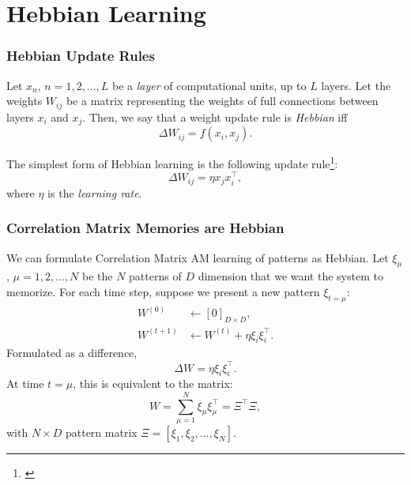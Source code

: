 \documentclass{beamer}
\begin{document}
\section{Hebbian Learning}
\begin{frame}
\frametitle{Hebbian Update Rules}
\begin{definition}
    Let $x_n$, $n = 1, 2, \dots, L$ be a \textit{layer} of computational
    units, up to $L$ layers. Let the weights $W_{ij}$ be a matrix 
    representing the weights of full connections between layers $x_i$ and
    $x_j$. Then, we say that a weight update rule is \textit{Hebbian} iff
    $$
    \Delta W_{ij} = f(x_i, x_j).
    $$
\end{definition}

\begin{example}
    The simplest form of Hebbian learning is the following update rule\footnote{\parencite{haykin_neural_2009}}:
    $$
    \Delta W_{ij} = \eta x_j x_i^\top,
    $$
    where $\eta$ is the \textit{learning rate}.
\end{example}
\end{frame}

\begin{frame}
\frametitle{Correlation Matrix Memories are Hebbian}

We can formulate Correlation Matrix AM learning of patterns as Hebbian.
Let $\xi_\mu$, $\mu = 1, 2, \dots, N$ be the $N$ patterns of $D$ dimension
that we want the system to memorize. For each time step, suppose we present
a new pattern $\xi_{t=\mu}$:
\begin{align*}
W^{(0)} &\gets [0]_{D \times D}, \\
W^{(t+1)} &\gets W^{(t)} + \eta \xi_i \xi_i^\top.
\end{align*}
Formulated as a difference,
$$
\Delta W = \eta \xi_i \xi_i^\top.
$$
At time $t = \mu$, this is equivalent to the matrix:
$$
W = \sum^N_{\mu=1} \xi_\mu \xi_\mu^\top = \Xi^\top \Xi,
$$
with $N \times D$ pattern matrix $\Xi = [\xi_1, \xi_2, \dots, \xi_N]$.
\end{frame}
\end{document}
